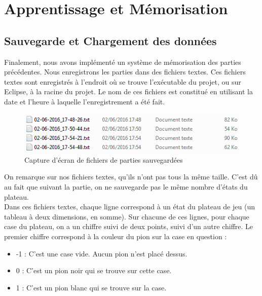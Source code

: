 \documentclass[a4paper, title page, 12pt]{report}
\begin{document}
	
	\newpage
	
	\section{Apprentissage et Mémorisation}
	\subsection{Sauvegarde et Chargement des données}
	Finalement, nous avons implémenté un système de mémorisation des parties précédentes. Nous enregistrons les parties dans des fichiers textes. Ces fichiers textes sont enregistrés à l'endroit où se trouve l'exécutable du projet, ou sur Eclipse, à la racine du projet. Le nom de ces fichiers est constitué en utilisant la date et l'heure à laquelle l'enregistrement a été fait. 
	
	\begin{figure}[h]
\begin{center}
\includegraphics{img/screenshot_fichierstextes.png}
\end{center}
\caption{Capture d'écran de fichiers de parties sauvegardées}
\end{figure}
	
	On remarque sur nos fichiers textes, qu'ils n'ont pas tous la même taille. C'est dû au fait que suivant la partie, on ne sauvegarde pas le même nombre d'états du plateau.\\
	
	Dans ces fichiers textes, chaque ligne correspond à un état du plateau de jeu (un tableau à deux dimensions, en somme). Sur chacune de ces lignes, pour chaque case du plateau, on a un chiffre suivi de deux points, suivi d'un autre chiffre. Le premier chiffre correspond à la couleur du pion sur la case en question :\\
	
	\begin{itemize}
		\item -1 : C'est une case vide. Aucun pion n'est placé dessus.
		\item 0  : C'est un pion noir qui se trouve sur cette case.
		\item 1  : C'est un pion blanc qui se trouve sur la case.\\
	\end{itemize}
	
\end{document}
